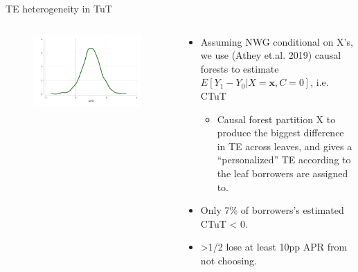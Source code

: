\documentclass[9pt, aspectratio=169]{beamer}
\begin{document}
\begin{frame}{TE heterogeneity in TuT}

\begin{columns}
\begin{column}{.43\textwidth}
\begin{figure}    
\centering
\includegraphics[width=0.99\textwidth]{Figuras/he_dist_tau_hat_tut.pdf}
\end{figure}
\end{column}
\begin{column}{.5\textwidth}
   \begin{itemize}
     \item Assuming NWG conditional on X's, we use (Athey et.al. 2019) causal forests to estimate $E[Y_1 - Y_0| X = \mathbf{x}, C = 0]$, i.e. CTuT
     \vspace{.1in}
     \begin{itemize}
	 \item Causal forest partition X to produce the biggest difference in TE across leaves, and gives a ``personalized'' TE according to the leaf borrowers are assigned to.
    \end{itemize}
    \vspace{.2in}
    \item Only 7\% of borrowers's estimated CTuT < 0.
    \vspace{.2in}
    \item >1/2 lose at least 10pp APR from not choosing.
    \end{itemize}
\end{column}
\end{columns}
\end{frame}


\end{document}
